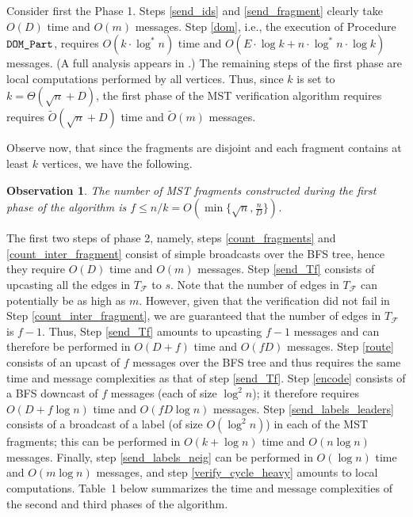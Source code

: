 \documentclass[11pt,letter]{article}
\def\DOM{\mbox{\tt DOM\_Part}}
\def\cF{\mathcal{F}}
\newtheorem{observation}[theorem]{Observation}
\begin{document}
Consider first the Phase 1. Steps \ref{send_ids} and \ref{send_fragment} clearly take $O(D)$ time and $O(m)$ messages.
Step \ref{dom}, i.e., the execution of 
Procedure $\DOM$, requires $O(k\cdot \log ^*n)$ time and 
$O(E\cdot \log k +n\cdot \log^*n\cdot \log k)$ messages. 
(A full analysis appears in \cite{Vitaly}.) 
The remaining steps of the first phase are local computations performed by 
all vertices. Thus, since $k$ is set to $k=\Theta(\sqrt{n}+D)$,
the first phase of the MST verification algorithm requires 
requires $\tilde{O}(\sqrt{n}+D)$ time and 
$\tilde{O}(m)$ messages.


Observe now, that since the fragments are disjoint and each fragment contains at least $k$ vertices, 
we have the following.
\begin{observation} 
\label{num_of_fragments}
The number of MST fragments constructed during the first phase of the 
algorithm is $f \le n/k=O(\min\{\sqrt{n}, \frac{n}{D}\})$. 
\end{observation} 

The first two steps of phase 2, namely, steps \ref{count_fragments}
and \ref{count_inter_fragment} consist of simple broadcasts over the BFS tree, hence they require 
$O(D)$ time and $O(m)$ messages. Step \ref{send_Tf} consists of upcasting all 
the edges in $T_{\cF}$ 
to $s$. Note that the number of edges in $T_{\cF}$ can potentially be as high as $m$. However, given that the verification did not fail in Step 
\ref{count_inter_fragment}, we are guaranteed that the number of edges in $T_{\cF}$ is $f-1$.
Thus, Step \ref{send_Tf} amounts to upcasting $f-1$ messages and can therefore be performed in $O(D+f)$ time and $O(f D)$ messages.
Step \ref{route}  consists of an upcast of $f$ messages over the BFS tree and thus requires the same time and message complexities as that of step \ref{send_Tf}.
Step \ref{encode} consists of a BFS downcast of $f$ messages (each of size 
$\log^2n$); it therefore requires $O(D+f \log n)$ time and $O(f D\log n )$ messages. Step \ref{send_labels_leaders} consists of a broadcast of a label (of size $O(\log^2 n)$) in each of the MST fragments; this can be performed in  $O(k+\log n)$ time and
$O(n \log n)$ messages. Finally, step \ref{send_labels_neig} can be performed in $O(\log n)$ time and $O(m\log n)$ messages, and step 
\ref{verify_cycle_heavy} amounts to  local computations.
Table~1 below
summarizes the time and message complexities of the second and third phases 
of the algorithm.
\end{document}
